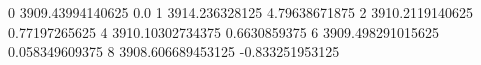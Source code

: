 0 3909.43994140625 0.0
1 3914.236328125 4.79638671875
2 3910.2119140625 0.77197265625
4 3910.10302734375 0.6630859375
6 3909.498291015625 0.058349609375
8 3908.606689453125 -0.833251953125
